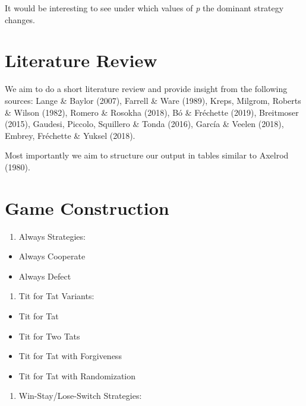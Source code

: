 \documentclass[11pt,preprint]{elsarticle}
\numberwithin{equation}{section}
\numberwithin{figure}{section}
\numberwithin{table}{section}
\def\tightlist{} %
\begin{document}
It would be interesting to see under which values of \emph{p} the
dominant strategy changes.

\section{\texorpdfstring{Literature
Review\label{litreview}}{Literature Review}}\label{literature-review}

We aim to do a short literature review and provide insight from the
following sources: Lange \& Baylor (2007), Farrell \& Ware (1989),
Kreps, Milgrom, Roberts \& Wilson (1982), Romero \& Rosokha (2018), Bó
\& Fréchette (2019), Breitmoser (2015), Gaudesi, Piccolo, Squillero \&
Tonda (2016), García \& Veelen (2018), Embrey, Fréchette \& Yuksel
(2018).

Most importantly we aim to structure our output in tables similar to
Axelrod (1980).

\section{Game Construction}\label{game-construction}

\begin{enumerate}
\def\labelenumi{\arabic{enumi}.}
\tightlist
\item
  Always Strategies:
\end{enumerate}

\begin{itemize}
\tightlist
\item
  Always Cooperate
\item
  Always Defect
\end{itemize}

\begin{enumerate}
\def\labelenumi{\arabic{enumi}.}
\setcounter{enumi}{1}
\tightlist
\item
  Tit for Tat Variants:
\end{enumerate}

\begin{itemize}
\tightlist
\item
  Tit for Tat
\item
  Tit for Two Tats
\item
  Tit for Tat with Forgiveness
\item
  Tit for Tat with Randomization
\end{itemize}

\begin{enumerate}
\def\labelenumi{\arabic{enumi}.}
\setcounter{enumi}{2}
\tightlist
\item
  Win-Stay/Lose-Switch Strategies:
\end{enumerate}
\end{document}
